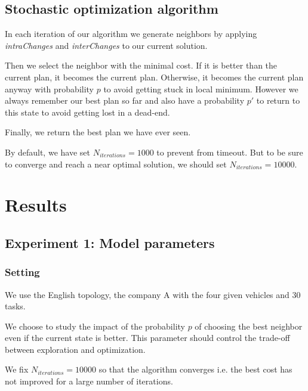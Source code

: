 \documentclass[11pt]{article}
\begin{document}
\subsection{Stochastic optimization algorithm}

In each iteration of our algorithm we generate neighbors by applying \textit{intraChanges} and \textit{interChanges} to our current solution. 

Then we select the neighbor with the minimal cost. If it is better than the current plan, it becomes the current plan. Otherwise, it becomes the current plan anyway with probability $p$ to avoid getting stuck in local minimum. However we always remember our best plan so far and also have a probability $p'$ to return to this state to avoid getting lost in a dead-end.

Finally, we return the best plan we have ever seen.

By default, we have set $N_{iterations} = 1000$ to prevent from timeout. But to be sure to converge and reach a near optimal solution, we should set $N_{iterations} = 10000$.

\section{Results}

\subsection{Experiment 1: Model parameters}

\subsubsection{Setting}

We use the English topology, the company A with the four given vehicles and 30 tasks.

We choose to study the impact of the probability $p$ of choosing the best neighbor even if the current state is better. This parameter should control the trade-off between exploration and optimization.

We fix $N_{iterations} = 10000$ so that the algorithm converges i.e. the best cost has not improved for a large number of iterations.
\end{document}
